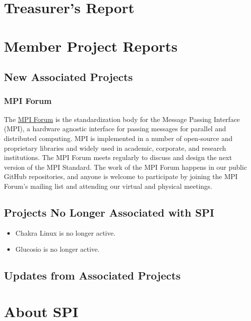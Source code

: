 \documentclass[a4paper]{report}
\begin{document}
\chapter{Treasurer's Report}

\chapter{Member Project Reports}

\section{New Associated Projects}

\subsection{MPI Forum}

The \href{https://www.mpi-forum.org/}{MPI Forum} is the standardization body for the Message Passing Interface (MPI), a hardware agnostic interface for passing messages for parallel and distributed computing. MPI is implemented in a number of open-source and proprietary libraries and widely used in academic, corporate, and research institutions. The MPI Forum meets regularly to discuss and design the next version of the MPI Standard. The work of the MPI Forum happens in our public GitHub repositories, and anyone is welcome to participate by joining the MPI Forum's mailing list and attending our virtual and physical meetings.

\section{Projects No Longer Associated with SPI}

\begin{itemize}

\item Chakra Linux is no longer active.

\item Glucosio is no longer active.

\end{itemize}

\section{Updates from Associated Projects}



\appendix
\chapter{About SPI}
\end{document}
